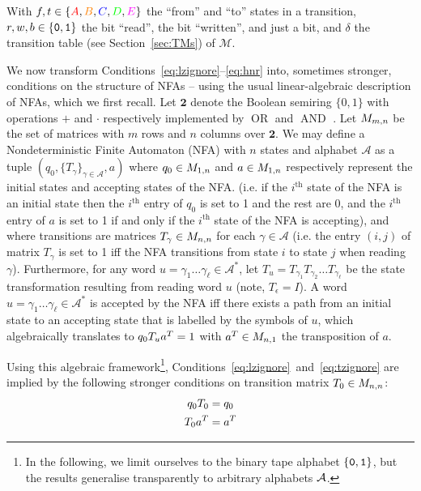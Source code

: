 With $f,t \in \{\stateA,\stateB,\stateC,\stateD,\stateE\}$ the ``from'' and ``to'' states in a transition, $r,w,b \in \left\{\texttt{0},\texttt{1}\right\}$ the bit ``read'', the bit ``written'', and just a bit, and $\delta$ the transition table (see Section~\ref{sec:TMs}) of $\mathcal{M}$.


We now transform Conditions~\eqref{eq:lzignore}–\eqref{eq:hnr} into, sometimes stronger, conditions on the structure of NFAs -- using the usual linear-algebraic description of NFAs, which we first recall. Let $\mathbf{2}$ denote the Boolean semiring $\{0,1\}$ with operations $+$ and $\cdot$ respectively implemented by $\operatorname{OR}$ and $\operatorname{AND}$ \cite{CUNINGHAMEGREEN1991251}. Let $M_{m,n}$ be the set of matrices with $m$ rows and $n$ columns over $\mathbf{2}$. We may define a Nondeterministic Finite Automaton (NFA) with $n$ states and alphabet $\mathcal{A}$ as a tuple $(q_0, \{T_\gamma\}_{\gamma \in \mathcal{A}}, a)$ where $q_0 \in M_{1,n}$ and $a \in M_{1,n}$ respectively represent the initial states and accepting states of the NFA. (i.e. if the $i^\text{th}$ state of the NFA is an initial state then the $i^\text{th}$ entry of $q_0$ is set to 1 and the rest are 0, and the $i^\text{th}$ entry of $a$ is set to 1 if and only if the $i^\text{th}$ state of the NFA is accepting), and where transitions are matrices $T_\gamma\in M_{n,n}$ for each $\gamma\in\mathcal{A}$ (i.e. the entry $(i,j)$ of matrix $T_\gamma$ is set to 1 iff the NFA transitions from state $i$ to state $j$ when reading $\gamma$). Furthermore, for any word $u=\gamma_1\dots\gamma_\ell \in \mathcal{A}^*$, let $T_u = T_{\gamma_1} T_{\gamma_2} \dots T_{\gamma_\ell}$ be the state transformation resulting from reading word $u$ (note, $T_\epsilon = I$). A word $u=\gamma_1\dots\gamma_\ell \in \mathcal{A}^*$ is accepted by the NFA iff there exists a path from an initial state to an accepting state that is labelled by the symbols of $u$, which algebraically translates to $q_0 T_u a^{T} = 1$ with $a^{T} \in M_{n,1}$ the transposition of $a$.

Using this algebraic framework\footnote{In the following, we limit ourselves to the binary tape alphabet $\left\{\texttt{0},\texttt{1}\right\}$, but the results generalise transparently to arbitrary alphabets $\mathcal{A}$.}, Conditions~\eqref{eq:lzignore}~and~\eqref{eq:tzignore} are implied by the following stronger conditions on transition matrix $T_0 \in M_{n,n}$:
\begin{align}
    q_0 T_0 & = q_0
    \label{far-cond-leading-0}
    \\
    T_0 a^{T} & = a^{T}
    \label{far-cond-trailing-0}
\end{align}

